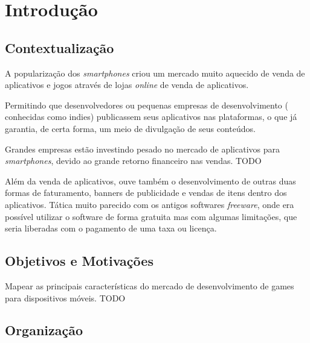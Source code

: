 
\chapter{Introdução}
\label{cap:introducao}


\section{Contextualização}

A popularização dos \emph{smartphones} criou um mercado muito aquecido de venda de aplicativos e jogos através de lojas \emph{online} de venda de aplicativos.

Permitindo que desenvolvedores ou pequenas empresas de desenvolvimento ( conhecidas como indies) publicassem seus aplicativos nas plataformas, o que já garantia, de certa forma, um meio de divulgação de seus conteúdos.


Grandes empresas estão investindo pesado no mercado de aplicativos para \emph{smartphones}, devido ao grande retorno financeiro nas vendas.
TODO

Além da venda de aplicativos, ouve também o desenvolvimento de outras duas formas de faturamento, banners de publicidade e vendas de itens dentro dos aplicativos. Tática muito parecido com os antigos softwares \emph{freeware}, onde era possível utilizar o software de forma gratuita mas com algumas limitações, que seria liberadas com o pagamento de uma taxa ou licença.






\section{Objetivos e Motivações}


Mapear as principais características do mercado de desenvolvimento de games para dispositivos móveis. TODO
 


\section{Organização}


